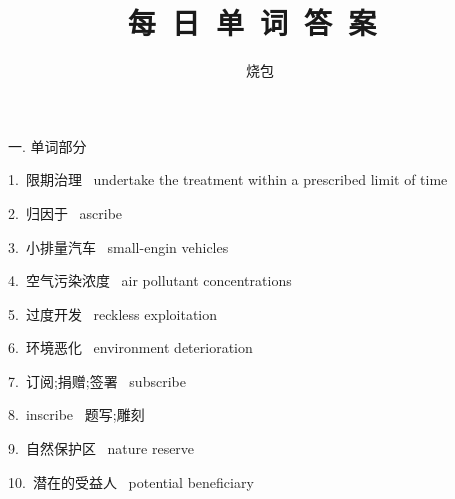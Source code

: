\documentclass[a4paper, 12pt]{article}
\begin{document}
    \noindent

    \title{ 每\ 日\ 单\ 词\ 答\ 案\  }
    \author{ 烧包 }
    \maketitle

\begin{flushleft}
一. 单词部分
\end{flushleft}

\begin{multicols}{2}
\begin{flushleft}
1.\ 限期治理 \ undertake the treatment within a prescribed limit of time
\end{flushleft}

\begin{flushleft}
2.\ 归因于 \ ascribe
\end{flushleft}
\end{multicols}

\begin{multicols}{2}
\begin{flushleft}
3.\ 小排量汽车 \ small-engin vehicles
\end{flushleft}

\begin{flushleft}
4.\ 空气污染浓度 \ air pollutant concentrations
\end{flushleft}
\end{multicols}

\begin{multicols}{2}
\begin{flushleft}
5.\ 过度开发 \ reckless exploitation
\end{flushleft}

\begin{flushleft}
6.\ 环境恶化 \ environment deterioration
\end{flushleft}
\end{multicols}

\begin{multicols}{2}
\begin{flushleft}
7.\ 订阅;捐赠;签署 \ subscribe
\end{flushleft}

\begin{flushleft}
8.\ inscribe \ 题写;雕刻
\end{flushleft}
\end{multicols}

\begin{multicols}{2}
\begin{flushleft}
9.\ 自然保护区 \ nature reserve
\end{flushleft}

\begin{flushleft}
10.\ 潜在的受益人 \ potential beneficiary
\end{flushleft}
\end{multicols}
\end{document}
